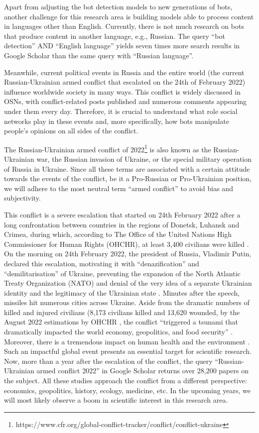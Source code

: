 Apart from adjusting the bot detection models to new generations of bots, another challenge for this research area is building models able to process content in languages other than English. Currently, there is not much research on bots that
produce content in another language, e.g., Russian. The query ``bot detection'' AND
 ``English language'' yields seven times more search results in Google Scholar than the same query with ``Russian language''.
 
Meanwhile, current political events in Russia and the entire world (the current Russian-Ukrainian armed conflict that escalated on the 24th of February 2022) influence worldwide society in many ways. This conflict is widely discussed in OSNs, with conflict-related posts published and numerous comments appearing under them every day. Therefore, it is crucial to understand what role social networks play in these events and, more specifically, how bots manipulate people's opinions on all sides of the conflict.

The Russian-Ukrainian armed conflict of 2022\footnote{https://www.cfr.org/global-conflict-tracker/conflict/conflict-ukraine} is also known as the Russian-Ukrainian war, the Russian invasion of Ukraine, or the special military operation of Russia in Ukraine. Since all these terms are associated with a certain attitude towards the events of the conflict, be it a Pro-Russian or Pro-Ukrainian position, we will adhere to the most neutral term ``armed conflict'' to avoid bias and subjectivity.

This conflict is a severe escalation that started on 24th February 2022 after a long confrontation between countries in the regions of Donetsk, Luhansk and Crimea, during which, according to The Office of the United Nations High Commissioner for Human Rights (OHCHR), at least 3,400 civilians were killed \cite{Statista2022a}. On the morning on 24th February 2022, the president of Russia, Vladimir Putin, declared this escalation, motivating it with ``denazification'' and ``demilitarisation'' of Ukraine, preventing the expansion of the North Atlantic Treaty Organization (NATO) and denial of the very idea of a separate Ukrainian identity and the legitimacy of the Ukrainian state \cite{Mankoff2022}. Minutes after the speech, missiles hit numerous cities across Ukraine. Aside from the dramatic numbers of killed and injured civilians (8,173 civilians killed and 13,620 wounded, by the August 2022 estimations by OHCHR \cite{Statista2022}, the conflict ``triggered a tsunami that dramatically impacted the world economy, geopolitics, and food security'' \cite{Pereira2022}. Moreover, there is a tremendous impact on human health and the environment \cite{Pereira2022}. Such an impactful global event presents an essential target for scientific research. Now, more than a year after the escalation of the conflict, the query ``Russian-Ukrainian armed conflict 2022'' in Google Scholar returns over 28,200 papers on the subject. All these studies approach the conflict from a different perspective: economics, geopolitics, history, ecology, medicine, etc. In the upcoming years, we will most likely observe a boom in scientific interest in this research area.

